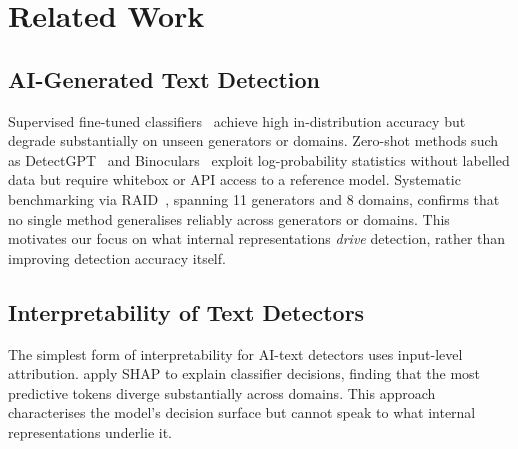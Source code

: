 \documentclass[11pt]{article}
\begin{document}
\section{Related Work}
\label{sec:related}

\subsection{AI-Generated Text Detection}

Supervised fine-tuned classifiers~\citep{solaiman2019release, zellers2019grover} achieve high in-distribution accuracy but degrade substantially on unseen generators or domains. Zero-shot methods such as DetectGPT~\citep{mitchell2023detectgpt} and Binoculars~\citep{hans2024binoculars} exploit log-probability statistics without labelled data but require whitebox or API access to a reference model. Systematic benchmarking via RAID~\citep{dugan2024raid}, spanning 11 generators and 8 domains, confirms that no single method generalises reliably across generators or domains. This motivates our focus on what internal representations \textit{drive} detection, rather than improving detection accuracy itself.

\subsection{Interpretability of Text Detectors}

The simplest form of interpretability for AI-text detectors uses input-level attribution. \citet{pudasaini2026why} apply SHAP to explain classifier decisions, finding that the most predictive tokens diverge substantially across domains. This approach characterises the model's decision surface but cannot speak to what internal representations underlie it.
\end{document}
